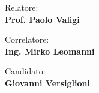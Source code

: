 \begin{titlepage}
\begin{spacing}{1}
	\vspace{30mm}

	\begin{minipage}[t]{0.47\textwidth}
		{\large{Relatore:}{\large\vspace{3mm} \bf\\ \large{Prof. Paolo Valigi\\ }}}
		
		\vspace{1mm}
		
		{\large{Correlatore:}{\large\vspace{3mm} \bf\\ \large{Ing. Mirko Leomanni\\ }}}
	\end{minipage}
	\hfill
	\begin{minipage}[t]{0.47\textwidth}\raggedleft
		{\large{Candidato:}{\large\vspace{3mm} \bf\\ \large{Giovanni Versiglioni\\ }}}
	\end{minipage}

	\vspace{45mm}
	
	\hrulefill
	\\
\end{spacing}

\end{titlepage}
      
